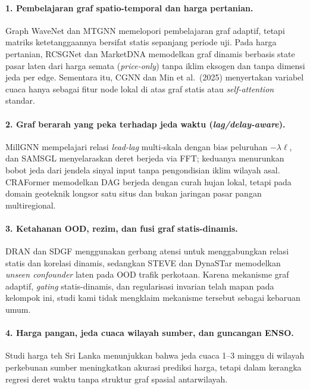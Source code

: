 \documentclass[11pt,a4paper]{article}
\begin{document}
\paragraph{1. Pembelajaran graf spatio-temporal dan harga pertanian.}
Graph WaveNet dan MTGNN memelopori pembelajaran graf adaptif, tetapi matriks ketetanggaannya
bersifat statis sepanjang periode uji. Pada harga pertanian, RCSGNet \cite{rcsgnet2026}
dan MarketDNA \cite{marketdna2026} memodelkan graf dinamis berbasis state pasar laten dari
harga semata (\textit{price-only}) tanpa iklim eksogen dan tanpa dimensi jeda per edge.
Sementara itu, CGNN \cite{cgnn2023} dan Min et al.\ (2025) menyertakan variabel cuaca hanya
sebagai fitur node lokal di atas graf statis atau \textit{self-attention} standar.

\paragraph{2. Graf berarah yang peka terhadap jeda waktu (\textit{lag/delay-aware}).}
MillGNN \cite{millgnn2025} mempelajari relasi \textit{lead-lag} multi-skala dengan bias
peluruhan $-\lambda\ell$, dan SAMSGL \cite{samsgl2023} menyelaraskan deret berjeda via FFT;
keduanya menurunkan bobot jeda dari jendela sinyal input tanpa pengondisian iklim wilayah asal.
CRAFormer \cite{craformer2025} memodelkan DAG berjeda dengan curah hujan lokal, tetapi pada
domain geoteknik longsor satu situs dan bukan jaringan pasar pangan multiregional.

\paragraph{3. Ketahanan OOD, rezim, dan fusi graf statis-dinamis.}
DRAN \cite{dran2025} dan SDGF \cite{sdgf2025} menggunakan gerbang atensi untuk menggabungkan
relasi statis dan korelasi dinamis, sedangkan STEVE \cite{ji2025steve} dan DynaSTar
\cite{hao2026dynastar} memodelkan \textit{unseen confounder} laten pada OOD trafik perkotaan.
Karena mekanisme graf adaptif, \textit{gating} statis-dinamis, dan regularisasi invarian telah
mapan pada kelompok ini, studi kami tidak mengklaim mekanisme tersebut sebagai kebaruan umum.

\paragraph{4. Harga pangan, jeda cuaca wilayah sumber, dan guncangan ENSO.}
Studi harga teh Sri Lanka \cite{tea2026} menunjukkan bahwa jeda cuaca 1--3 minggu di wilayah
perkebunan sumber meningkatkan akurasi prediksi harga, tetapi dalam kerangka regresi deret
waktu tanpa struktur graf spasial antarwilayah.
\end{document}
